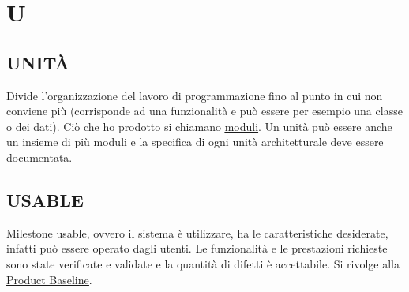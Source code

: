 \newpage
	\section{U} \label{sec:U}		
	
		\subsection{UNITÀ}	 \label{unita}	
		Divide l'organizzazione del lavoro di programmazione fino al punto in cui non conviene più (corrisponde ad una funzionalità e può essere per esempio una classe o dei dati). Ciò che ho prodotto si chiamano \underline{\hyperref[moduli]{moduli}}. Un unità può essere anche un insieme di più moduli e la specifica di ogni unità architetturale deve essere documentata.
	
		\subsection{USABLE}		\label{usable}
		Milestone usable, ovvero il sistema è utilizzare, ha le caratteristiche desiderate, infatti può essere operato dagli utenti. Le funzionalità e le prestazioni richieste sono state verificate e validate e la quantità di difetti è accettabile. Si rivolge alla \underline{\hyperref[productbaseline]{Product Baseline}}.
	
	
